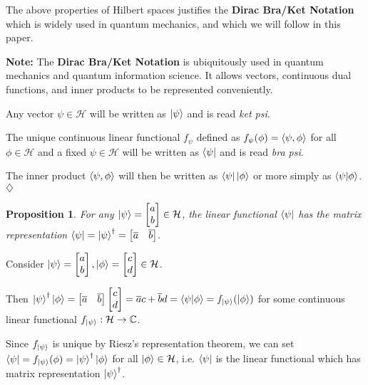 \documentclass[12pt,twoside,fleqn]{report}
\makeatletter
\theoremstyle{thmstyle}
\renewenvironment{proof}[1][\proofname]{\par
\pushQED{\qed}%
\normalfont \topsep6\p@\@plus6\p@\relax
\trivlist
\item[\hskip\labelsep\itshape#1\@addpunct{.}]\mbox{}\par\nobreak\ignorespaces
}{%
    \popQED\endtrivlist\@endpefalse
    }
\newtheorem{prop}{Proposition}[chapter]
\newenvironment{note}{\textbf{Note:}}{\hfill\ensuremath{\diamondsuit}}
\makeatother
\begin{document}
The above properties of Hilbert spaces justifies the \textbf{Dirac Bra/Ket Notation} which is widely used in quantum mechanics, and which we will follow in this paper.

\begin{note}
    The \textbf{Dirac Bra/Ket Notation} is ubiquitously used in quantum mechanics and quantum information science. It allows vectors, continuous dual functions, and inner products to be represented conveniently. 

    Any vector $\psi \in \mathcal{H}$ will be written as $\ket{\psi}$ and is read \textit{ket psi}.

    The unique continuous linear functional $f_\psi$ defined as $f_{\psi}(\phi) = \braket{\psi, \phi}$ for all $\phi \in \mathcal{H}$ and a fixed $\psi \in \mathcal{H}$ will be written as $\bra{\psi}$ and is read \textit{bra psi}.

    The inner product $\braket{\psi, \phi}$ will then be written as $\bra{\psi} \ket{\phi}$ or more simply as $\braket{\psi|\phi}$.
\end{note}

\begin{prop}
    For any $\ket{\psi} = \begin{bmatrix} a \\ b\end{bmatrix} \in \mathcal{H}$, the linear functional $\bra{\psi}$ has the matrix representation $\bra\psi = \ket{\psi}^\dagger = \begin{bmatrix} \overline{a} & \overline{b} \end{bmatrix}$. 
\end{prop}
\begin{proof}

    Consider $\ket{\psi} = \begin{bmatrix} a \\ b\end{bmatrix}, \ket{\phi} = \begin{bmatrix} c \\ d \end{bmatrix} \in \mathcal{H}$.

        Then $\ket{\psi}^\dagger \ket{\phi} = \begin{bmatrix}\overline{a} & \overline{b} \end{bmatrix}  \begin{bmatrix} c \\ d \end{bmatrix} = \overline{a} c + \overline{b} d = \braket{\psi|\phi} = f_{\ket{\psi}}(\ket{\phi})$ for some continuous linear functional $f_{\ket{\psi}}: \mathcal{H} \to \mathbb{C}$.

            Since $f_{\ket\psi}$ is unique by Riesz's representation theorem, we can set $\bra{\psi} = f_{\ket\psi}(\phi) = \ket{\psi}^\dagger \ket{\phi}$ for all $\ket\phi \in \mathcal{H}$, i.e. $\bra{\psi}$ is the linear functional which has matrix representation $\ket{\psi}^\dagger$.
\end{proof}
\end{document}

